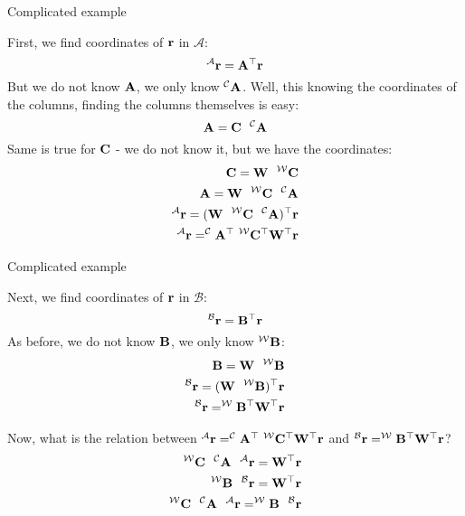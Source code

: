 \documentclass{beamer}
\begin{document}
\begin{frame}{Complicated example}
	\begin{flushleft}
		
		First, we find coordinates of $\mathbf{r}$ in $\mathcal{A}$:
		\begin{equation}
			^\mathcal{A} \mathbf{r} = \mathbf{A}^\top \mathbf{r}
		\end{equation}
		But we do not know $\mathbf{A}$, we only know $^\mathcal{C} \mathbf{A}$. Well, this knowing the coordinates of the columns, finding the columns themselves is easy:
		\begin{equation}
			\mathbf{A} =\mathbf{C} \ \ ^\mathcal{C} \mathbf{A} 
		\end{equation}		
		Same is true for $\mathbf{C}$ - we do not know it, but we have the coordinates:
		\begin{align}
			\bo{C} =\bo{W} \ \ ^\mathcal{W} \bo{C} \\
			\bo{A} =\bo{W} \ \ ^\mathcal{W} \bo{C} \ \ ^\mathcal{C} \bo{A} \\
			^\mathcal{A} \bo{r} = (\bo{W} \ \ ^\mathcal{W} \bo{C} \ \ ^\mathcal{C} \bo{A})\T \bo{r} \\
			^\mathcal{A} \bo{r} =^\mathcal{C}\bo{A}\T \  ^\mathcal{W} \bo{C}\T \bo{W}\T  \bo{r} 
		\end{align}				
		
	\end{flushleft}
\end{frame}


\begin{frame}{Complicated example}
	\begin{flushleft}
		
		Next, we find coordinates of $\mathbf{r}$ in $\mathcal{B}$:
		\begin{equation}
			^\mathcal{B} \mathbf{r} = \mathbf{B}^\top \mathbf{r}
		\end{equation}
		As before, we do not know $\mathbf{B}$, we only know $^\mathcal{W} \mathbf{B}$:
		\begin{align}
			\mathbf{B} =\mathbf{W} \ \ ^\mathcal{W} \mathbf{B}  \\
			^\mathcal{B} \mathbf{r} = (\mathbf{W} \ \ ^\mathcal{W} \mathbf{B})^\top \mathbf{r} \\
			^\mathcal{B} \mathbf{r} = ^\mathcal{W} \mathbf{B}^\top \mathbf{W}^\top \mathbf{r}
		\end{align}		
					
		Now, what is the relation between $^\mathcal{A} \mathbf{r} =^\mathcal{C}\mathbf{A}^\top \  ^\mathcal{W} \mathbf{C}^\top \mathbf{W}^\top  \mathbf{r} $ and $^\mathcal{B} \mathbf{r} = ^\mathcal{W} \mathbf{B}^\top \mathbf{W}^\top \mathbf{r}$?
		\begin{align}
			^\mathcal{W} \mathbf{C} \ \ ^\mathcal{C}\mathbf{A} \ \ ^\mathcal{A} \mathbf{r} = \mathbf{W}^\top  \mathbf{r} \\
			^\mathcal{W} \mathbf{B} \ \ ^\mathcal{B} \mathbf{r} =  \mathbf{W}^\top \mathbf{r} \\
			^\mathcal{W} \mathbf{C} \ \ ^\mathcal{C}\mathbf{A} \ \ ^\mathcal{A} \mathbf{r} = 
			^\mathcal{W} \mathbf{B} \ \ ^\mathcal{B} \mathbf{r}
		\end{align}				
		
	\end{flushleft}
\end{frame}
\end{document}

